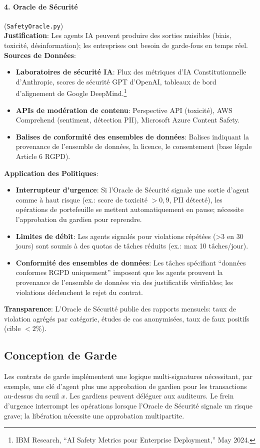 \documentclass[11pt]{article}
\begin{document}
\paragraph{4. Oracle de Sécurité} (\texttt{SafetyOracle.py})\\
\textbf{Justification}: Les agents IA peuvent produire des sorties nuisibles (biais, toxicité, désinformation); les entreprises ont besoin de garde-fous en temps réel.\\
\textbf{Sources de Données}:
\begin{itemize}[noitemsep]
  \item \textbf{Laboratoires de sécurité IA}: Flux des métriques d'IA Constitutionnelle d'Anthropic, scores de sécurité GPT d'OpenAI, tableaux de bord d'alignement de Google DeepMind.\footnote{IBM Research, ``AI Safety Metrics pour Enterprise Deployment,'' May 2024.}
  \item \textbf{APIs de modération de contenu}: Perspective API (toxicité), AWS Comprehend (sentiment, détection PII), Microsoft Azure Content Safety.
  \item \textbf{Balises de conformité des ensembles de données}: Balises indiquant la provenance de l'ensemble de données, la licence, le consentement (base légale Article 6 RGPD).
\end{itemize}
\textbf{Application des Politiques}:
\begin{itemize}[noitemsep]
  \item \textbf{Interrupteur d'urgence}: Si l'Oracle de Sécurité signale une sortie d'agent comme à haut risque (ex.: score de toxicité $>0,9$, PII détecté), les opérations de portefeuille se mettent automatiquement en pause; nécessite l'approbation du gardien pour reprendre.
  \item \textbf{Limites de débit}: Les agents signalés pour violations répétées (>3 en 30 jours) sont soumis à des quotas de tâches réduits (ex.: max 10 tâches/jour).
  \item \textbf{Conformité des ensembles de données}: Les tâches spécifiant ``données conformes RGPD uniquement'' imposent que les agents prouvent la provenance de l'ensemble de données via des justificatifs vérifiables; les violations déclenchent le rejet du contrat.
\end{itemize}
\textbf{Transparence}: L'Oracle de Sécurité publie des rapports mensuels: taux de violation agrégés par catégorie, études de cas anonymisées, taux de faux positifs (cible $<2\%$).

\subsection{Conception de Garde}
Les contrats de garde implémentent une logique multi-signatures nécessitant, par exemple, une clé d'agent plus une approbation de gardien pour les transactions au-dessus du seuil $x$. Les gardiens peuvent déléguer aux auditeurs. Le frein d'urgence interrompt les opérations lorsque l'Oracle de Sécurité signale un risque grave; la libération nécessite une approbation multipartite.
\end{document}
